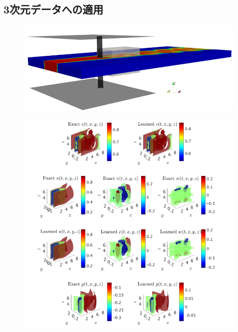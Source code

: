 \documentclass[xcolor=dvipsnames,hyperref={breaklinks=true},mathserif,professionalfont,dvipdfmx,12pt]{beamer}
\begin{document}
\subsection{3次元データへの適用}
\begin{frame}[t]
  \begin{figure}[H]
    \centering
      \includegraphics[width=1\linewidth]{figure/fig8.png}
  \end{figure}
\end{frame}

\begin{frame}
  \begin{figure}[H]
    \centering
      \includegraphics[width=0.7\linewidth]{figure/fig9.png}
  \end{figure}
\end{frame}



\end{document}
